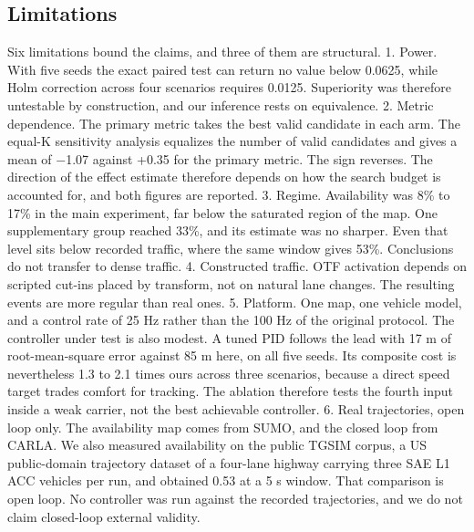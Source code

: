 \documentclass[journal]{IEEEtran}
\begin{document}
\subsection{Limitations}
Six limitations bound the claims, and three of them are structural.
1. Power. With five seeds the exact paired test can return no value below 0.0625, while Holm
correction across four scenarios requires 0.0125. Superiority was therefore untestable by
construction, and our inference rests on equivalence.
2. Metric dependence. The primary metric takes the best valid candidate in each arm. The equal-K
sensitivity analysis equalizes the number of valid candidates and gives a mean of $-$1.07 against
+0.35 for the primary metric. The sign reverses. The direction of the effect estimate therefore
depends on how the search budget is accounted for, and both figures are reported.
3. Regime. Availability was 8\% to 17\% in the main experiment, far below the saturated region of the
map. One supplementary group reached 33\%, and its estimate was no sharper. Even that level sits below
recorded traffic, where the same window gives 53\%. Conclusions do not transfer to dense traffic.
4. Constructed traffic. OTF activation depends on scripted cut-ins placed by transform, not on
natural lane changes. The resulting events are more regular than real ones.
5. Platform. One map, one vehicle model, and a control rate of 25 Hz rather than the 100 Hz of the
original protocol. The controller under test is also modest. A tuned PID follows the lead with 17 m
of root-mean-square error against 85 m here, on all five seeds. Its composite cost is nevertheless 1.3
to 2.1 times ours across three scenarios, because a direct speed target trades comfort for tracking.
The ablation therefore tests the fourth input inside a weak carrier, not the best achievable controller.
6. Real trajectories, open loop only. The availability map comes from SUMO, and the closed loop from
CARLA. We also measured availability on the public TGSIM corpus, a US public-domain trajectory dataset
of a four-lane highway carrying three SAE L1 ACC vehicles per run, and obtained 0.53 at a 5 s window.
That comparison is open loop. No controller was run against the recorded trajectories, and we do not
claim closed-loop external validity.
\end{document}

